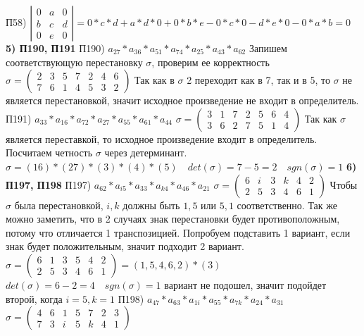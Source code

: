 \documentclass[12pt, a4paper]{article}
\begin{document}
	П58) $\left | \begin{array}{rrr} 0 & a & 0\\ b & c & d \\ 0 & e & 0\end{array} \right | = 0*c*d + a*d*0 + 0*b*e - 0*c*0 - d*e*0 - 0*a*b = 0$ \newpage
	\textbf{5) П190, П191} \sspace
	П190) $a_{27}*a_{36}*a_{51}*a_{74}*a_{25}*a_{43}*a_{62}$ \sspace
	Запишем соответствующую перестановку $\sigma$, проверим ее корректность \sspace
	$\sigma = \begin{pmatrix} 2 & 3 & 5 & 7  & 2 & 4 & 6  \\ 7 & 6 & 1 & 4  & 5 & 3 & 2 \end{pmatrix}$ \sspace
	Так как в $\sigma$ 2 переходит как в 7, так и в 5, то $\sigma$ не является перестановкой, значит исходное произведение не входит в определитель. \sspace
	П191) $a_{33}*a_{16}*a_{72}*a_{27}*a_{55}*a_{61}*a_{44}$ \sspace
	$\sigma = \begin{pmatrix} 3 & 1 & 7 & 2  & 5 & 6 & 4  \\ 3 & 6 & 2 & 7  & 5 & 1 & 4 \end{pmatrix}$ \sspace
	Так как $\sigma$ является переставкой, то исходное произведение входит в определитель. Посчитаем четность $\sigma$ через детерминант. \sspace
	$\sigma =  (16) * (27) * (3) * (4) * (5) \quad det(\sigma)  = 7 - 5 = 2 \quad sgn(\sigma) = 1$ \sspace
	\textbf{6) П197, П198} \sspace
	П197) $a_{62}*a_{i5}*a_{33}*a_{k4}*a_{46}*a_{21}$ \sspace
	$\sigma = \begin{pmatrix} 6 & i & 3 & k  & 4 & 2 \\ 2 & 5 & 3 & 4 & 6 & 1\end{pmatrix}$ \sspace
	Чтобы $\sigma$ была перестановкой, $i, k$ должны быть $1, 5$ или $5, 1$ соответственно. Так же можно заметить, что в 2 случаях знак перестановки будет противоположным, потому что отличается 1 транспозицией. Попробуем подставить 1 вариант, если знак будет положительным, значит подходит 2 вариант. \sspace
	$\sigma  = \begin{pmatrix} 6 &1 & 3 & 5  & 4 & 2 \\ 2 & 5 & 3 & 4 & 6 & 1\end{pmatrix} = (1,5,4,6,2)*(3) $ \sspace
	$det(\sigma) = 6 - 2 = 4 \quad sgn(\sigma) = 1$  вариант не подошел, значит подойдет второй, когда $i = 5, k = 1 $ \sspace
	П198) $a_{47}*a_{63}*a_{1i}*a_{55}*a_{7k}*a_{24}*a_{31}$ \sspace
	$\sigma = \begin{pmatrix} 4 & 6 & 1 & 5  & 7 & 2 & 3\\ 7 & 3 & i & 5 & k & 4 & 1\end{pmatrix}$ \sspace
\end{document}
